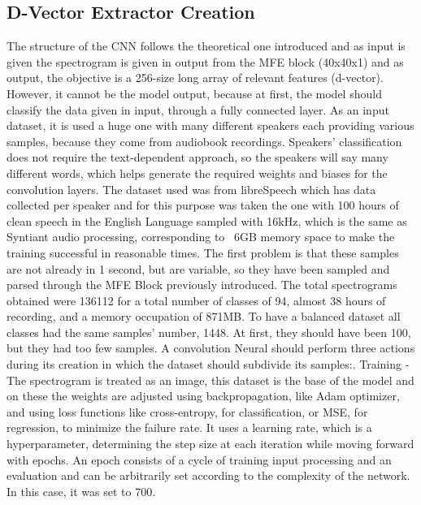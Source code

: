 \subsection{D-Vector Extractor Creation}
\label{subsec:d-vector extractor creation}
The structure of the CNN follows the theoretical one introduced and as input is given the spectrogram is given in output from the MFE block (40x40x1) and as output, the objective is a 256-size long array of relevant features (d-vector). However, it cannot be the model output, because at first, the model should classify the data given in input, through a fully connected layer. As an input dataset, it is used a huge one with many different speakers each providing various samples, because they come from audiobook recordings. Speakers' classification does not require the text-dependent approach, so the speakers will say many different words, which helps generate the required weights and biases for the convolution layers. The dataset used was from libreSpeech which has data collected per speaker and for this purpose was taken the one with 100 hours of clean speech in the English Language sampled with 16kHz, which is the same as Syntiant audio processing\cite{librispeech}, corresponding to ~6GB memory space to make the training successful in reasonable times.\newline
The first problem is that these samples are not already in 1 second, but are variable, so they have been sampled and parsed through the MFE Block previously introduced. The total spectrograms obtained were 136112 for a total number of classes of 94, almost 38 hours of recording, and a memory occupation of 871MB. To have a balanced dataset all classes had the same samples' number, 1448. At first, they should have been 100, but they had too few samples. A convolution Neural should perform three actions during its creation in which the dataset should subdivide its samples:\newline{}. Training - The spectrogram is treated as an image, this dataset is the base of the model and on these the weights are adjusted using backpropagation, like Adam optimizer, and using loss functions like cross-entropy, for classification, or MSE, for regression, to minimize the failure rate. It uses a learning rate, which is a hyperparameter, determining the step size at each iteration while moving forward with epochs. An epoch consists of a cycle of training input processing and an evaluation and can be arbitrarily set according to the complexity of the network. In this case, it was set to 700.
